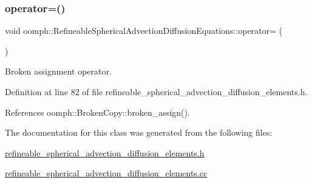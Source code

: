 \subsubsection{\texorpdfstring{operator=()}{operator=()}}
{\footnotesize\ttfamily void oomph\+::\+Refineable\+Spherical\+Advection\+Diffusion\+Equations\+::operator= (\begin{DoxyParamCaption}\item[{const \hyperlink{classoomph_1_1RefineableSphericalAdvectionDiffusionEquations}{Refineable\+Spherical\+Advection\+Diffusion\+Equations} \&}]{ }\end{DoxyParamCaption})\hspace{0.3cm}{\ttfamily [inline]}}



Broken assignment operator. 



Definition at line 82 of file refineable\+\_\+spherical\+\_\+advection\+\_\+diffusion\+\_\+elements.\+h.



References oomph\+::\+Broken\+Copy\+::broken\+\_\+assign().



The documentation for this class was generated from the following files\+:\begin{DoxyCompactItemize}
\item 
\hyperlink{refineable__spherical__advection__diffusion__elements_8h}{refineable\+\_\+spherical\+\_\+advection\+\_\+diffusion\+\_\+elements.\+h}\item 
\hyperlink{refineable__spherical__advection__diffusion__elements_8cc}{refineable\+\_\+spherical\+\_\+advection\+\_\+diffusion\+\_\+elements.\+cc}\end{DoxyCompactItemize}
